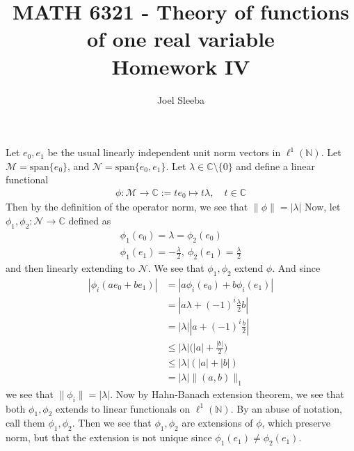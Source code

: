 \documentclass[12pt]{exam}
\theoremstyle{plain} %
\theoremstyle{definition} %
\theoremstyle{remark} %
\begin{document}
\title{MATH 6321 - Theory of functions of one real variable \\ Homework  IV}

\author{
  Joel Sleeba \\
}

\maketitle
\printanswers
\unframedsolutions

\begin{questions}
  \question
  \begin{solution}
    Let $e_0, e_1$ be the usual linearly independent unit norm vectors in
    $\ell^{1}(\mathbb{N})$. Let $ \mathcal{M} = \textrm{span}\{ e_0 \}$, and
    $\mathcal{N} = \textrm{span}\{ e_0, e_1 \}$. Let $ \lambda \in
    \mathbb{C}\setminus \{ 0 \}$ and define a linear functional
    \begin{align*}
      \phi :  \mathcal{M} \to  \mathbb{C} := t e_0 \mapsto t \lambda,
      \quad t \in \mathbb{C}
    \end{align*}
    Then by the definition of the operator norm, we see that
    $\|\phi\| = |\lambda|$
    Now, let $\phi_1, \phi_2: \mathcal{N} \to \mathbb{C}$ defined as
    \begin{align*}
      \phi_1(e_0) = \lambda = \phi_2(e_0) \\
      \phi_1(e_1) = -\frac{\lambda}{2}, \ \phi_2(e_1) = \frac{\lambda}{2}
    \end{align*}
    and then linearly extending to $\mathcal{N}$. We see that $\phi_1,
    \phi_2$ extend $\phi$. And since
    \begin{align*}
      |\phi_i(a e_0 + be_1)| &= |a \phi_i(e_0) + b \phi_i(e_1)| \\
      &= | a  \lambda  + (-1)^i\frac{\lambda}{2}b| \\
      &= |\lambda| |a + (-1)^i \frac{b}{2}| \\
      &\le |\lambda| \Big(|a| + \frac{|b|}{2} \Big) \\
      &\le |\lambda| (|a| + |b|) \\
      &= |\lambda| \|(a, b)\|_1
    \end{align*}
    we see that $\|\phi_i\| = |\lambda|$. Now by Hahn-Banach
    extension theorem, we see that both $\phi_1, \phi_2$ extends to
    linear functionals on $\ell^{1}(\mathbb{N})$. By an abuse of
    notation, call them $ \phi_1, \phi_2$. Then we see that $\phi_1,
    \phi_2$ are extensions of $\phi$, which preserve norm, but that
    the extension is not unique since $\phi_1(e_1) \neq \phi_2(e_1)$.
  \end{solution}


\end{questions}
\end{document}
